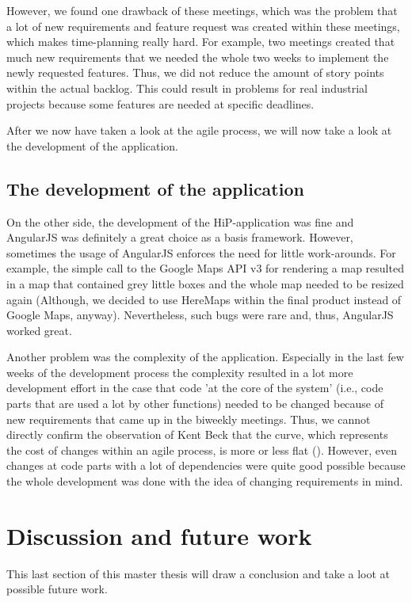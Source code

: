However, we found one drawback of these meetings, which was the problem that a lot of new requirements and feature request was created within these meetings, which makes time-planning really hard. For example, two meetings created that much new requirements that we needed the whole two weeks to implement the newly requested features. Thus, we did not reduce the amount of story points within the actual backlog. This could result in problems for real industrial projects because some features are needed at specific deadlines.

After we now have taken a look at the agile process, we will now take a look at the development of the application.   

\subsection{The development of the application}
On the other side, the development of the \ac{HiP}-application was fine and AngularJS was definitely a great choice as a basis framework. However, sometimes the usage of AngularJS enforces the need for little work-arounds. For example, the simple call to the Google Maps API v3 for rendering a map resulted in a map that contained grey little boxes and the whole map needed to be resized again (Although, we decided to use HereMaps within the final product instead of Google Maps, anyway). Nevertheless, such bugs were rare and, thus, AngularJS worked great. 

Another problem was the complexity of the application. Especially in the last few weeks of the development process the complexity resulted in a lot more development effort in the case that code 'at the core of the system' (i.e., code parts that are used a lot by other functions) needed to be changed because of new requirements that came up in the biweekly meetings. Thus, we cannot directly confirm the observation of Kent Beck that the curve, which represents the cost of changes within an agile process, is more or less flat (\cite{beck2003test}). However, even changes at code parts with a lot of dependencies were quite good possible because the whole development was done with the idea of changing requirements in mind. 

\section{Discussion and future work}
This last section of this master thesis will draw a conclusion and take a loot at possible future work.

